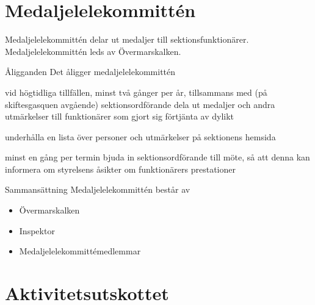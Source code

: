 \documentclass[pdfbookmarks,a4paper,11pt]{article}
\newlength{\itemcollength}
\newenvironment{reglemlista}{%
  \begin{list}{}{%
      \setlength{\labelwidth}{\itemcollength}%
      \setlength{\leftmargin}{\labelwidth + \labelsep}%
      \renewcommand{\makelabel}[1]{%
        \raisebox{0pt}[1ex][0pt]{%
          \makebox[\labelwidth][l]{%
            \parbox[t]{\itemcollength}{%
              \raggedright\hspace{0pt}##1}}}\hfill}%
      }}{%
  \end{list}}
\begin{document}
\section{Medaljelelekommittén}

Medaljelelekommittén delar ut medaljer till sektionsfunktionärer. Medaljelelekommittén leds av Övermarskalken.

\begin{reglemlista}

	\item[Åligganden]
	Det åligger medaljelelekommittén
	\begin{attlista}
		\item vid högtidliga tillfällen, minst två gånger per år, tillsammans med (på skiftesgasquen avgående) sektionsordförande dela ut medaljer och andra utmärkelser till funktionärer som gjort sig förtjänta av dylikt
		\item underhålla en lista över personer och utmärkelser på sektionens hemsida
		\item minst en gång per termin bjuda in sektionsordförande till möte, så att denna kan informera om styrelsens åsikter om funktionärers prestationer
	\end{attlista}

	\item[Sammansättning]
	Medaljelelekommittén består av
	\begin{itemize}
		\item Övermarskalken
		\item Inspektor
		\item Medaljelelekommittémedlemmar
	\end{itemize}
\end{reglemlista}

\section{Aktivitetsutskottet}
\end{document}
